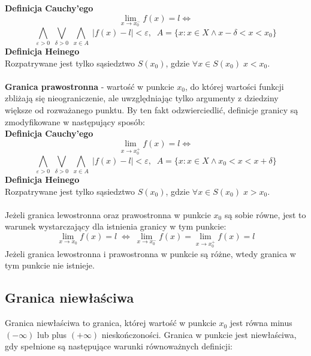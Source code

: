 \documentclass[14pt,a4paper]{extarticle}
\begin{document}
\noindent\textbf{Definicja Cauchy'ego}
$$\lim_{x\to x_{0}^{-}} f(x) = l \Leftrightarrow $$
$$\underset{\varepsilon > 0}{\bigwedge} \;\underset{\delta > 0}{\bigvee} \; \underset{x \in A}{\bigwedge} \; \vert f(x) - l\vert < \varepsilon, \;\; A = \{x:x\in X \land x - \delta < x < x_{0}\}$$
\noindent\textbf{Definicja Heinego}\\
Rozpatrywane jest tylko sąsiedztwo $S(x_{0})$, gdzie $\forall x \in S(x_{0})\; x < x_{0}$.\\\\

\noindent\textbf{Granica prawostronna} - wartość w punkcie $x_{0}$, do której wartości funkcji zbliżają się nieograniczenie,
ale uwzględniając tylko argumenty z dziedziny większe od rozważanego punktu. By ten fakt odzwierciedlić, definicje
granicy są zmodyfikowane w następujący sposób:\\

\noindent\textbf{Definicja Cauchy'ego}
$$\lim_{x\to x_{0}^{+}} f(x) = l \Leftrightarrow $$
$$\underset{\varepsilon > 0}{\bigwedge} \;\underset{\delta > 0}{\bigvee} \; \underset{x \in A}{\bigwedge} \; \vert f(x) - l\vert < \varepsilon, \;\; A = \{x:x\in X \land x_{0} < x < x + \delta\}$$
\noindent\textbf{Definicja Heinego}\\
Rozpatrywane jest tylko sąsiedztwo $S(x_{0})$, gdzie $\forall x \in S(x_{0})\; x > x_{0}$.\\\\

\noindent Jeżeli granica lewostronna oraz prawostronna w punkcie $x_{0}$ są sobie równe, jest to warunek wystarczający
dla istnienia granicy w tym punkcie:
$$\lim_{x\to x_{0}}f(x) = l \; \Leftrightarrow \; \lim_{x\to x_{0}^{-}}f(x) = \lim_{x\to x_{0}^{+}}f(x) = l$$
Jeżeli granica lewostronna i prawostronna w punkcie są różne, wtedy granica w tym punkcie nie istnieje.\\

\subsection{Granica niewłaściwa}
Granica niewłaściwa to granica, której wartość w punkcie $x_{0}$ jest równa minus $(-\infty)$ lub plus $(+\infty)$ nieskończoności.
Granica w punkcie jest niewłaściwa, gdy spełnione są następujące warunki równoważnych definicji:\\
\end{document}
